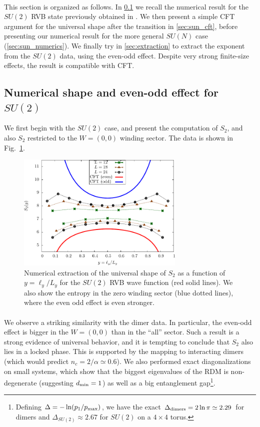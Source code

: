 \documentclass[11pt]{iopart}
\begin{document}
\paragraph{}
This section is organized as follows. In \ref{sec:su2_numerics} we recall the numerical result for the $SU(2)$ RVB state previously obtained in \cite{Ju2012}. We then present a simple CFT argument for the universal shape after the transition in \ref{sec:sun_cft}, before presenting our numerical result for the more general $SU(N)$ case (\ref{sec:sun_numerics}). We finally try in \ref{sec:extraction} to extract the exponent from the $SU(2)$ data, using the even-odd effect. Despite very strong finite-size effects, the result is compatible with CFT. 
\subsection{Numerical shape and even-odd effect for $SU(2)$}
\label{sec:su2_numerics}
We first begin with the $SU(2)$ case, and present the computation of $S_2$, and also $S_2$ restricted to the $W=(0,0)$ winding sector. The data is shown in Fig.~\ref{fig:SU2_shape}.
\begin{figure}[ht]
 \begin{center}
  \includegraphics[width=8cm]{./figures/SU2_shape.pdf}
 \end{center}
\caption{Numerical extraction of the universal shape of $S_2$ as a function of $y=\ell_y/L_y$ for the $SU(2)$ RVB wave function (red solid lines). We also show the entropy in the zero winding sector (blue dotted lines), where the even odd effect is even stronger. }
\label{fig:SU2_shape}
\end{figure}
\paragraph{}We observe a striking similarity with the dimer data. In particular, the even-odd effect is bigger in the $W=(0,0)$ than in the ``all'' sector. Such a result is a strong evidence of universal behavior, and it is tempting to conclude that $S_2$ also lies in a locked phase. This is supported by the mapping to interacting dimers\cite{Damle} (which would predict $n_c= 2/\alpha\simeq 0.6$). We also performed exact diagonalizations on small systems, which show that the biggest eigenvalues of the RDM is non-degenerate (suggesting $d_{\rm min}=1$) as well as a big entanglement gap\footnote{Defining $\Delta=-\ln (p_1/p_{\rm max})$, we have the exact\cite{Stephan12,FisherStephenson} $\Delta_{\rm dimers}=2\ln \pi\simeq 2.29$ for dimers and $\Delta_{SU(2)}\approx 2.67$ for $SU(2)$ on a $4\times 4$ torus.}. 
\end{document}
